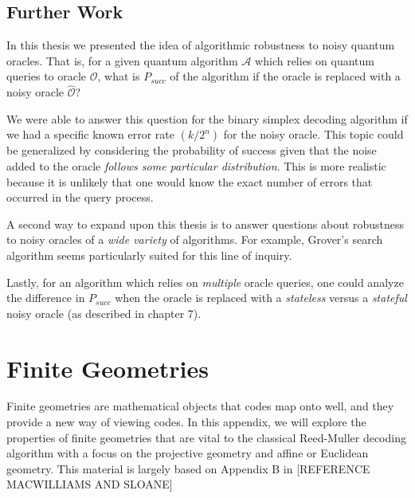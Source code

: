 \documentclass[12pt,twoside]{reedthesis}
\theoremstyle{definition}
\begin{document}
\section{Further Work}
In this thesis we presented the idea of algorithmic robustness to noisy quantum oracles. That is, for a given quantum algorithm $\mathcal{A}$ which relies on quantum queries to oracle $\mathcal{O}$, what is $P_{succ}$ of the algorithm if the oracle is replaced with a noisy oracle $\widehat{\mathcal{O}}$?

We were able to answer this question for the binary simplex decoding algorithm if we had a specific known error rate $(k/2^n)$ for the noisy oracle. This topic could be generalized by considering the probability of success given that the noise added to the oracle \emph{follows some particular distribution}. This is more realistic because it is unlikely that one would know the exact number of errors that occurred in the query process. 

A second way to expand upon this thesis is to answer questions about robustness to noisy oracles of a \emph{wide variety} of algorithms. For example, Grover's search algorithm \citep{grover1996fast} seems particularly suited for this line of inquiry. 

Lastly, for an algorithm which relies on \emph{multiple} oracle queries, one could analyze the difference in $P_{succ}$ when the oracle is replaced with a \emph{stateless} versus a \emph{stateful} noisy oracle (as described in chapter 7).



    \appendix

	
\chapter{Finite Geometries} \label{finite_geom_chapter}
Finite geometries are mathematical objects that codes map onto well, and they provide a new way of viewing codes. In this appendix, we will explore the properties of finite geometries that are vital to the classical Reed-Muller decoding algorithm with a focus on the projective geometry and affine or Euclidean geometry. This material is largely based on Appendix B in [REFERENCE MACWILLIAMS AND SLOANE]
\end{document}

